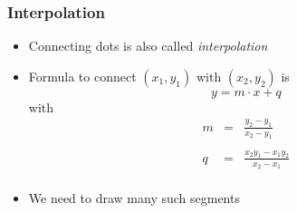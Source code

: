 \begin{frame}
  \frametitle{Interpolation}
  \begin{itemize}
    \item Connecting dots is also called \emph{interpolation}
    \item Formula to connect $(x_1,y_1)$ with $(x_2,y_2)$ is
          \[
            y = m \cdot x + q
          \]
          with
          \[
            \begin{array}{rcl}
              m & = & \displaystyle \frac{y_2-y_1}{x_2-y_1} \\ \\
              q & = & \displaystyle \frac{x_2 y_1-x_1y_2}{x_2-x_1} \\
            \end{array}
          \]
    \item We need to draw many such segments
  \end{itemize}
\end{frame}




